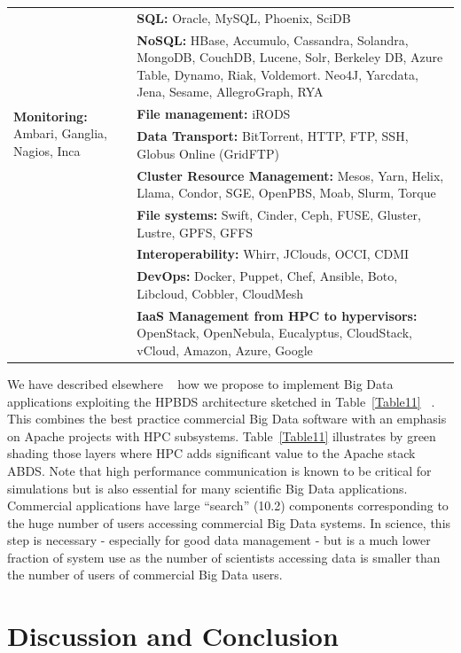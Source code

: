 \documentclass{acm_proc_article-sp}
\begin{document}
\begin{table}[t]
\begin{tabular}{|p{2cm}|p{6cm}|}
&\textbf{SQL:} Oracle, MySQL, Phoenix, SciDB\\ \cline{2-2}
&\textbf{NoSQL:} HBase, Accumulo, Cassandra, Solandra, MongoDB, CouchDB, Lucene, Solr, Berkeley DB, Azure Table, Dynamo, Riak, Voldemort. Neo4J, Yarcdata, Jena, Sesame, AllegroGraph, RYA\\ \hline
\multirow{2}{2cm}{\textbf{Monitoring:} Ambari, Ganglia, Nagios, Inca}
&\textbf{File management:} iRODS\\ \cline{2-2}
&\textbf{Data Transport:} BitTorrent, HTTP, FTP, SSH, Globus Online (GridFTP)\\ \cline{2-2}
&\textbf{Cluster Resource Management:} Mesos, Yarn, Helix, Llama, Condor, SGE, OpenPBS, Moab, Slurm, Torque\\ \cline{2-2}
&\textbf{File systems:} Swift, Cinder, Ceph, FUSE, Gluster, Lustre, GPFS, GFFS\\ \cline{2-2}
&\textbf{Interoperability:} Whirr, JClouds, OCCI, CDMI\\ \cline{2-2}
&\textbf{DevOps:} Docker, Puppet, Chef, Ansible, Boto, Libcloud, Cobbler, CloudMesh\\ \cline{2-2}
&\textbf{IaaS Management from HPC to hypervisors:} OpenStack, OpenNebula, Eucalyptus, CloudStack, vCloud, Amazon, Azure, Google\\ \hline
\end{tabular}

\end{table}


We have described elsewhere ~\cite{b30,b14,b27} how we propose to implement Big Data applications exploiting the HPBDS architecture sketched in Table~\ref{Table11} ~\cite{b2}. This combines the best practice commercial Big Data software with an emphasis on Apache projects with HPC subsystems. Table~\ref{Table11} illustrates by green shading those layers where HPC adds significant value to the Apache stack ABDS. Note that high performance communication is known to be critical for simulations but is also essential for many scientific Big Data applications. Commercial applications have large ``search'' (10.2) components corresponding to the huge number of users accessing commercial Big Data systems. In science, this step is necessary - especially for good data management - but is a much lower fraction of system use as the number of scientists accessing data is smaller than the number of users of commercial Big Data users.

\section{Discussion and Conclusion}
\end{document}
